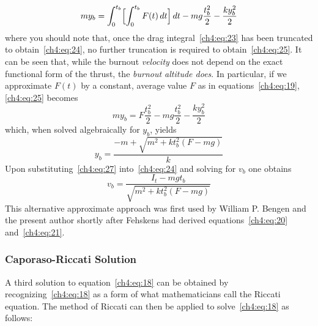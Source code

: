 \begin{equation}\label{ch4:eq:25}
my_b = \int_{0}^{t_b}\Bigl[\int_{0}^{t_b} F(t)\,dt\Bigr]\,dt - mg\frac{t_b^{2}}{2} - \frac{ky_b^{2}}{2}
\end{equation}
where you should note that, once the drag integral~\eqref{ch4:eq:23} has been truncated to
obtain~\eqref{ch4:eq:24}, no further truncation is required to obtain~\eqref{ch4:eq:25}. It can be
seen that, while the burnout \emph{velocity} does not depend on the exact functional form of the
thrust, the \emph{burnout altitude does}. In particular, if we approximate $F(t)$ by a constant,
average value $F$ as in equations~\eqref{ch4:eq:19}, \eqref{ch4:eq:25} becomes
\begin{equation}\label{ch4:eq:26}
my_b = F\frac{t_b^{2}}{2} - mg\frac{t_b^{2}}{2} - \frac{ky_b^{2}}{2}
\end{equation}
which, when solved algebraically for $y_b$, yields
\begin{equation}\label{ch4:eq:27}
y_b = \frac{-m + \sqrt{m^{2} + kt_b^{2}(F - mg)}}{k}
\end{equation}
Upon substituting~\eqref{ch4:eq:27} into~\eqref{ch4:eq:24} and solving for $v_b$ one obtains
\begin{equation}\label{ch4:eq:28}
v_b = \frac{I_t - mgt_b}{\sqrt{m^{2} + kt_b^{2}(F - mg)}}
\end{equation}
This alternative approximate approach was first used by William P. Bengen and the present author
shortly after Fehskens had derived equations~\eqref{ch4:eq:20} and~\eqref{ch4:eq:21}.

\subsubsection{Caporaso-Riccati Solution}\label{ch4:sec:2.1.3}

A third solution to equation~\eqref{ch4:eq:18} can be obtained by recognizing~\eqref{ch4:eq:18} as
a form of what mathematicians call the Riccati equation. The method of Riccati can then be applied
to solve~\eqref{ch4:eq:18} as follows:

